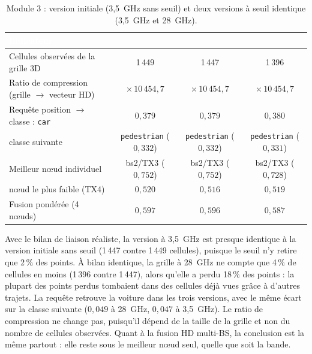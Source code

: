 \documentclass[12pt,a4paper,titlepage]{article}
\newcommand{\hd}[1]{\textcolor{white}{\textbf{#1}}}
\begin{document}
\begin{table}[H]
    \centering
    \caption{Module 3 : version initiale (3,5~GHz sans seuil) et deux versions à seuil identique (3,5~GHz et 28~GHz).}
    \label{tab:hd_compare}
    \begin{tabularx}{\textwidth}{F{4.6cm}CCC}
        \toprule
        \hd{Indicateur} & \hd{} & \hd{} & \hd{} \\
        \midrule
        Cellules observées de la grille 3D & 1\,449 & 1\,447 & 1\,396 \\
        Ratio de compression (grille $\to$ vecteur HD) & $\times\,10\,454{,}7$ & $\times\,10\,454{,}7$ & $\times\,10\,454{,}7$ \\
        Requête position $\to$ classe : \texttt{car} & $0{,}379$ & $0{,}379$ & $0{,}380$ \\
        \quad classe suivante & \texttt{pedestrian} ($0{,}332$) & \texttt{pedestrian} ($0{,}332$) & \texttt{pedestrian} ($0{,}331$) \\
        Meilleur n\oe ud individuel & bs2/TX3 ($0{,}752$) & bs2/TX3 ($0{,}752$) & bs2/TX3 ($0{,}728$) \\
        n\oe ud le plus faible (TX4) & $0{,}520$ & $0{,}516$ & $0{,}519$ \\
        Fusion pondérée (4 n\oe uds) & $0{,}597$ & $0{,}596$ & $0{,}587$ \\
        \bottomrule
    \end{tabularx}
\end{table}

Avec le bilan de liaison réaliste, la version à 3,5~GHz est presque identique à la version initiale sans seuil (1\,447 contre 1\,449 cellules), puisque le seuil n'y retire que 2\,\% des points. À bilan identique, la grille à 28~GHz ne compte que 4\,\% de cellules en moins (1\,396 contre 1\,447), alors qu'elle a perdu 18\,\% des points : la plupart des points perdus tombaient dans des cellules déjà vues grâce à d'autres trajets. La requête retrouve la voiture dans les trois versions, avec le même écart sur la classe suivante ($0{,}049$ à 28~GHz, $0{,}047$ à 3,5~GHz). Le ratio de compression ne change pas, puisqu'il dépend de la taille de la grille et non du nombre de cellules observées. Quant à la fusion HD multi-BS, la conclusion est la même partout : elle reste sous le meilleur n\oe ud seul, quelle que soit la bande.
\end{document}
